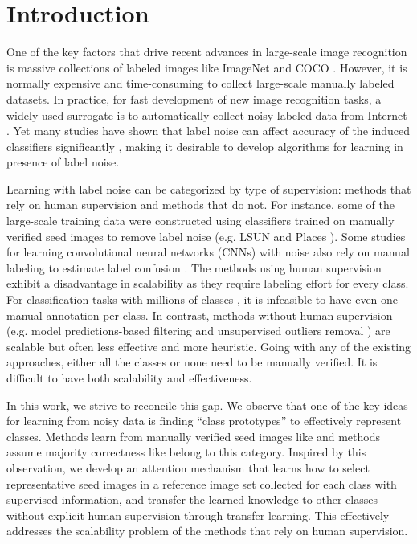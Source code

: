 \documentclass[10pt,twocolumn,letterpaper]{article}
\begin{document}
\section{Introduction}
\label{Introduction}
One of the key factors that drive recent advances in large-scale image recognition is massive collections of labeled images like ImageNet \cite{deng2009imagenet} and COCO \cite{lin2014microsoft}. However, it is normally expensive and time-consuming to collect large-scale manually labeled datasets. In practice, for fast development of new image recognition tasks, a widely used surrogate is to automatically collect noisy labeled data from Internet \cite{fergus2010learning,krause2016unreasonable,schroff2011harvesting}. Yet many studies have shown that label noise can affect accuracy of the induced classifiers significantly \cite{frenay2014classification,nettleton2010study,rolnick2017deep,sukhbaatar2014training}, making it desirable to develop algorithms for learning in presence of label noise.

Learning with label noise can be categorized by type of supervision: methods that rely on human supervision and methods that do not. For instance, some of the large-scale training data were constructed using classifiers trained on manually verified seed images to remove label noise (e.g. LSUN \cite{yu2015lsun} and Places \cite{zhou2017places}). Some studies for learning convolutional neural networks (CNNs) with noise also rely on manual labeling to estimate label confusion \cite{patrini2017making,xiao2015learning}. The methods using human supervision exhibit a disadvantage in scalability as they require labeling effort for every class. For classification tasks with millions of classes \cite{dean2013fast,frome2013devise}, it is infeasible to have even one manual annotation per class. In contrast, methods without human supervision (e.g. model predictions-based filtering \cite{frenay2014classification} and unsupervised outliers removal \cite{liu2014unsupervised,scholkopf2001estimating,xia2015learning}) are scalable but often less effective and more heuristic. Going with any of the existing approaches, either all the classes or none need to be manually verified. It is difficult to have both scalability and effectiveness.

In this work, we strive to reconcile this gap. We observe that one of the key ideas for learning from noisy data is finding ``class prototypes'' to effectively represent classes. Methods learn from manually verified seed images like \cite{yu2015lsun} and methods assume majority correctness like \cite{azadi2016auxiliary} belong to this category. Inspired by this observation, we develop an attention mechanism that learns how to select representative seed images in a reference image set collected for each class with supervised information, and transfer the learned knowledge to other classes without explicit human supervision through transfer learning. This effectively addresses the scalability problem of the methods that rely on human supervision. 
\end{document}
